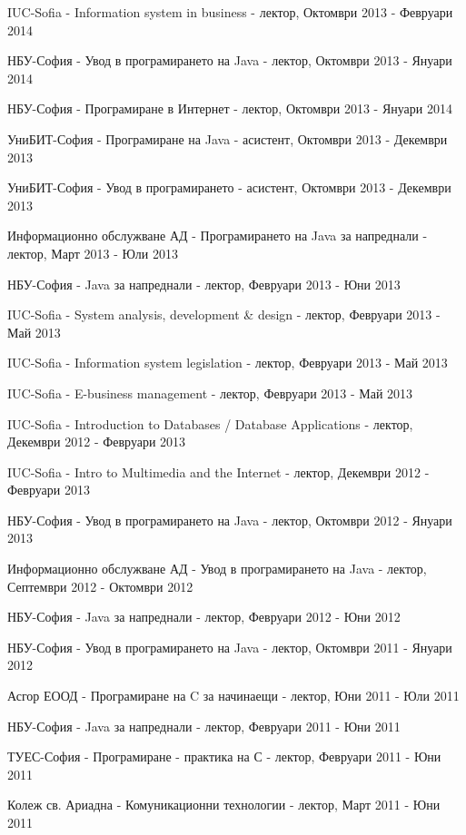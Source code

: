 \documentclass[bulgarian,a4paper]{europasscv}
\begin{document}
\begin{europasscv}
{\begin{ecvitemize}
    \item IUC-Sofia - Information system in business - лектор, Октомври 2013 - Февруари 2014
    \item НБУ-София - Увод в програмирането на Java - лектор, Октомври 2013 - Януари 2014
    \item НБУ-София - Програмиране в Интернет - лектор, Октомври 2013 - Януари 2014
    \item УниБИТ-София - Програмиране на Java - асистент, Октомври 2013 - Декември 2013
    \item УниБИТ-София - Увод в програмирането - асистент, Октомври 2013 - Декември 2013
    \item Информационно обслужване АД - Програмирането на Java за напреднали - лектор, Март 2013 - Юли 2013
    \item НБУ-София - Java за напреднали - лектор, Февруари 2013 - Юни 2013
    \item IUC-Sofia - System analysis, development \& design - лектор, Февруари 2013 - Май 2013
    \item IUC-Sofia - Information system legislation - лектор, Февруари 2013 - Май 2013
    \item IUC-Sofia - E-business management - лектор, Февруари 2013 - Май 2013
    \item IUC-Sofia - Introduction to Databases / Database Applications - лектор, Декември 2012 - Февруари 2013
    \item IUC-Sofia - Intro to Multimedia and the Internet - лектор, Декември 2012 - Февруари 2013
    \item НБУ-София - Увод в програмирането на Java - лектор, Октомври 2012 - Януари 2013
    \item Информационно обслужване АД - Увод в програмирането на Java - лектор, Септември 2012 - Октомври 2012
    \item НБУ-София - Java за напреднали - лектор, Февруари 2012 - Юни 2012
    \item НБУ-София - Увод в програмирането на Java - лектор, Октомври 2011 - Януари 2012
    \item Асгор ЕООД - Програмиране на C за начинаещи - лектор, Юни 2011 - Юли 2011
    \item НБУ-София - Java за напреднали - лектор, Февруари 2011 - Юни 2011
    \item ТУЕС-София - Програмиране - практика на С - лектор, Февруари 2011 - Юни 2011
    \item Колеж св. Ариадна - Комуникационни технологии - лектор, Март 2011 - Юни 2011

\end{ecvitemize}}
\end{europasscv}
\end{document}
